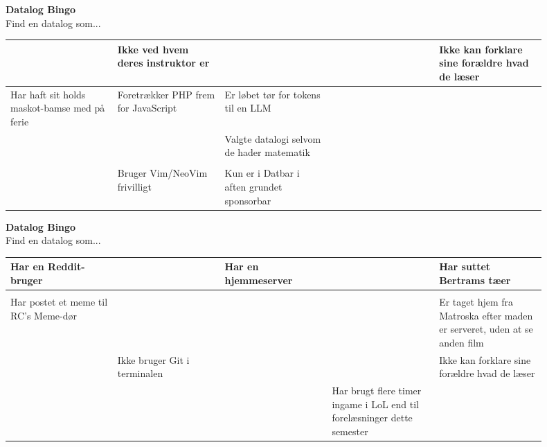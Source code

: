\documentclass{article}
\begin{document}
\begin{center}
{\LARGE\bfseries Datalog Bingo}\\[0.5em]
{\large Find en datalog som...}\\[2em]
\begin{tabular}{|p{0.18\linewidth}|p{0.18\linewidth}|p{0.18\linewidth}|p{0.18\linewidth}|p{0.18\linewidth}|}
\hline
  & Ikke ved hvem deres instruktor er &   &   & Ikke kan forklare sine forældre hvad de læser \\
\hline
Har haft sit holds maskot-bamse med på ferie & Foretrækker PHP frem for JavaScript & Er løbet tør for tokens til en LLM &   &   \\
\hline
  &   & Valgte datalogi selvom de hader matematik &   &   \\
\hline
  &   &   &   &   \\
\hline
  & Bruger Vim/NeoVim frivilligt & Kun er i Datbar i aften grundet sponsorbar &   &   \\
\hline
\end{tabular}
\end{center}
\newpage

\begin{center}
{\LARGE\bfseries Datalog Bingo}\\[0.5em]
{\large Find en datalog som...}\\[2em]
\begin{tabular}{|p{0.18\linewidth}|p{0.18\linewidth}|p{0.18\linewidth}|p{0.18\linewidth}|p{0.18\linewidth}|}
\hline
Har en Reddit-bruger &   & Har en hjemmeserver &   & Har suttet Bertrams tæer \\
\hline
  &   &   &   &   \\
\hline
Har postet et meme til RC's Meme-dør &   &   &   & Er taget hjem fra Matroska efter maden er serveret, uden at se anden film \\
\hline
  & Ikke bruger Git i terminalen &   &   & Ikke kan forklare sine forældre hvad de læser \\
\hline
  &   &   & Har brugt flere timer ingame i LoL end til forelæsninger dette semester &   \\
\hline
\end{tabular}
\end{center}
\newpage
\end{document}
